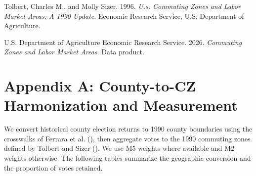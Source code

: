 \documentclass[
  11pt,
]{article}
\newlength{\cslhangindent}
\newenvironment{CSLReferences}[2] %
 {\begin{list}{}{%
  \setlength{\itemindent}{0pt}
  \setlength{\leftmargin}{0pt}
  \setlength{\parsep}{0pt}
  \ifodd #1
   \setlength{\leftmargin}{\cslhangindent}
   \setlength{\itemindent}{-1\cslhangindent}
  \fi
  \setlength{\itemsep}{#2\baselineskip}}}
 {\end{list}}
\begin{document}
\begin{CSLReferences}{1}{1}
Tolbert, Charles M., and Molly Sizer. 1996. \emph{U.s. Commuting Zones
and Labor Market Areas: A 1990 Update}. Economic Research Service, U.S.
Department of Agriculture.

U.S. Department of Agriculture Economic Research Service. 2026.
\emph{Commuting Zones and Labor Market Areas}. Data product.

\end{CSLReferences}

\newpage
\appendix

\section{Appendix A: County-to-CZ Harmonization and
Measurement}\label{appendix-a-county-to-cz-harmonization-and-measurement}

We convert historical county election returns to 1990 county boundaries
using the crosswalks of Ferrara et al.
(), then aggregate votes to the
1990 commuting zones defined by Tolbert and Sizer
(). We use M5 weights where
available and M2 weights otherwise. The following tables summarize the
geographic conversion and the proportion of votes retained.
\end{document}
